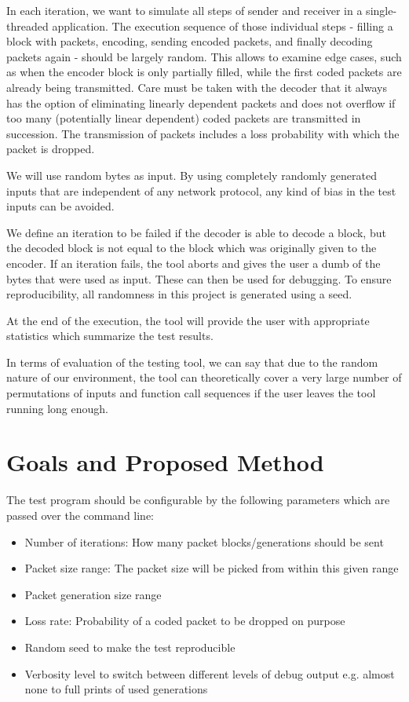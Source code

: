 \documentclass[a4paper,english,10pt]{tumarticle}
\begin{document}
In each iteration, we want to simulate all steps of sender and receiver in a single-threaded application. 
The execution sequence of those individual steps - filling a block with packets, encoding, sending encoded packets, and finally decoding packets again - should be largely random. 
This allows to examine edge cases, such as when the encoder block is only partially filled, while the first coded packets are already being transmitted. Care must be taken with the decoder that it always has the option of eliminating linearly dependent packets and does not overflow if too many (potentially linear dependent) coded packets are transmitted in succession. 
The transmission of packets includes a loss probability with which the packet is dropped.

We will use random bytes as input. By using completely randomly generated inputs that are independent of any network protocol, any kind of bias in the test inputs can be avoided.

We define an iteration to be failed if the decoder is able to decode a block, but the decoded block is not equal to the block which was originally given to the encoder. If an iteration fails, the tool aborts and gives the user a dumb of the bytes that were used as input. These can then be used for debugging. To ensure reproducibility, all randomness in this project is generated using a seed.

At the end of the execution, the tool will provide the user with appropriate statistics which summarize the test results. 

In terms of evaluation of the testing tool, we can say that due to the random nature of our
environment, the tool can theoretically cover a very large number of permutations of inputs and
function call sequences if the user leaves the tool running long enough.


\section{Goals and Proposed Method}\label{sec:milestones}

The test program should be configurable by the following parameters which are passed over the command
line:
\begin{itemize}
    \setlength{\itemsep}{1pt}
	\setlength{\parskip}{0pt}
	\setlength{\parsep}{0pt}
    \item Number of iterations: How many packet blocks/generations should be sent
    \item Packet size range: The packet size will be picked from within this given range
    \item Packet generation size range
    \item Loss rate: Probability of a coded packet to be dropped on purpose
    \item Random seed to make the test reproducible
    \item Verbosity level to switch between different levels of debug output e.g. almost none to full prints of used generations
\end{itemize}
\end{document}

